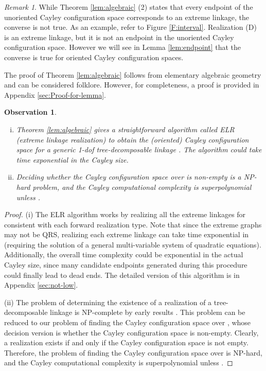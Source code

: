 \documentclass[secthm,amsthm,english]{article}
\newtheorem{observation}{Observation}
\theoremstyle{definition}
\theoremstyle{remark}
\newtheorem{remark}{Remark}
\begin{document}
\begin{remark} \label{rmk:endpoint}
While Theorem \ref{lem:algebraic} (2) states that every endpoint of the unoriented Cayley configuration space
corresponds to an extreme linkage, 
the converse is not true. 
As an example, refer to Figure \ref{F:interval}. 
Realization (D) is an extreme linkage, 
but it is not an endpoint in the unoriented Cayley configuration space.
However we will see in Lemma \ref{lem:endpoint} that the converse is true for oriented Cayley configuration spaces. 
\end{remark}

The proof of Theorem \ref{lem:algebraic} follows from elementary algebraic geometry and can be considered folklore. 
However, for completeness, a proof is provided in Appendix \ref{sec:Proof-for-lemma}. 

\begin{observation} \label{obs:NP-hard}
\begin{enumerate}[(i)]
\item Theorem \ref{lem:algebraic} gives a straightforward algorithm  called {\emph{ELR (extreme linkage realization)}} 
to obtain the (oriented) Cayley configuration space for a generic 1-dof tree-decomposable linkage . 
The algorithm could take time exponential in the Cayley size.

\item Deciding whether the Cayley configuration space over  is non-empty is a NP-hard problem, and
the Cayley computational complexity is superpolynomial unless . 
\end{enumerate}

\end{observation}

\begin{proof}
(i) The ELR algorithm works by realizing all the extreme linkages for  consistent with each forward realization type. 
Note that since the extreme graphs may not be QRS, realizing each extreme linkage can take time exponential in  
(requiring the solution of a general multi-variable system of quadratic equations).
Additionally, the overall time complexity could be exponential in the actual Cayley size, 
since many candidate endpoints generated during this procedure could finally lead to dead ends. 
The detailed version of this algorithm is in Appendix \ref{sec:not-low}. 



(ii) The problem of determining the existence of a realization of a tree-decomposable linkage 
is NP-complete by early results \cite{bib:saxe79}. This problem can be reduced to our problem of finding the Cayley configuration space over , 
whose decision version is whether the Cayley configuration space is non-empty. 
Clearly, a realization exists if and only if the Cayley configuration space is not empty. 
Therefore, the problem of finding the Cayley configuration space over  is NP-hard, and the Cayley computational complexity is superpolynomial unless .
\end{proof}
\end{document}
